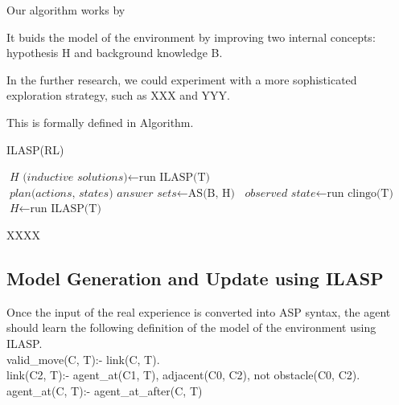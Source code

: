 Our algorithm works by 

It buids the model of the environment by improving two internal concepts: hypothesis H and background knowledge B. 


In the further research, we could experiment with a more sophisticated exploration strategy, such as XXX and YYY. 


This is formally defined in Algorithm. 

\begin{algorithm}
\caption{ILASP(RL)}\label{euclid}
\begin{algorithmic}[1]


    \State $\textit{H (inductive solutions)} \gets \text{run ILASP(T)}$
    \State $\textit{plan(actions, states) answer sets} \gets \text{AS(B, H)}$
        \State $\textit{observed state} \gets \text{run clingo(T)}$
            \State $\textit{H} \gets \text{run ILASP(T)}$
            \EndIf
    \EndWhile
\EndWhile

\EndProcedure
\caption{XXXX }
\end{algorithmic}
\end{algorithm}

\subsection{Model Generation and Update using ILASP}
\label{model_generation_and_update}
Once the input of the real experience is converted into ASP syntax, the agent should learn the following definition of the model of the environment using ILASP. \\

valid\_move(C, T):- link(C, T).
\\
link(C2, T):- agent\_at(C1, T), adjacent(C0, C2), not obstacle(C0, C2).\\
agent\_at(C, T):- agent\_at\_after(C, T) \\

